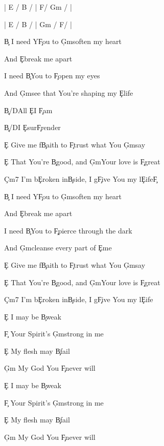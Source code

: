 \documentclass[9pt]{extarticle}
\begin{document}
\bsong

\bi
|  E / B /  |  F\s  / G\s m /  |

|  E / B /  |  G\s m / F\s  /  |
\ei

\bv
\c{B} I need Y\c{F\s }ou to \c{G\s m}soften my heart

And \c{E}break me apart

I need \c{B}You to \c{F\s }open my eyes

And \c{G\s m}see that You're shaping my \c{E}life
\ev

\bp
\c{B/D\s }All \c{E}I \c{F\s }am

\c{B/D\s }I \c{E}sur\c{F\s }render
\ep

\bc
\c{E} Give me f\c{B}aith to \c{F\s }trust what You \c{G\s m}say

\c{E} That You're \c{B}good, and \c{G\s m}Your love is \c{F\s }great

\c{C\s m7} I'm b\c{E}roken in\c{B}side, I g\c{F\s }ive You my l\c{E}ife\c{F\s }
\ec

\bv
\c{B} I need Y\c{F\s }ou to \c{G\s m}soften my heart

And \c{E}break me apart

I need \c{B}You to \c{F\s }pierce through the dark

And \c{G\s m}cleanse every part of \c{E}me
\ev


\bc
\c{E} Give me f\c{B}aith to \c{F\s }trust what You \c{G\s m}say

\c{E} That You're \c{B}good, and \c{G\s m}Your love is \c{F\s }great

\c{C\s m7} I'm b\c{E}roken in\c{B}side, I g\c{F\s }ive You my l\c{E}ife
\ec

\bb
\c{E} I may be \c{B}weak

\c{F\s } Your Spirit's \c{G\s m}strong in me

\c{E} My flesh may \c{B}fail

\c{G\s m} My God You \c{F\s }never will

\c{E} I may be \c{B}weak

\c{F\s } Your Spirit's \c{G\s m}strong in me

\c{E} My flesh may \c{B}fail

\c{G\s m} My God You \c{F\s }never will
\eb




\esong
\end{document}
